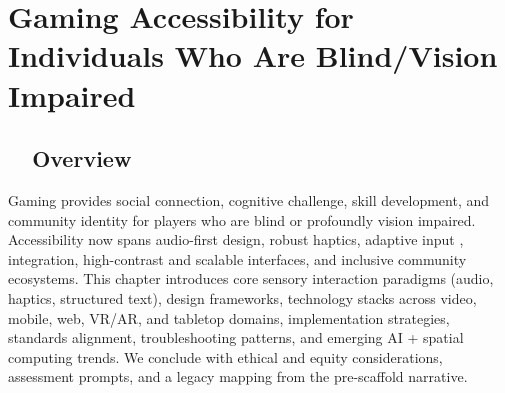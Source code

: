 \chapter{Gaming Accessibility for Individuals Who Are Blind/Vision Impaired}
\label{chap:gaming-accessibility}

\section{~~Overview}
\label{sec:gaming-overview}
Gaming provides social connection, cognitive challenge, skill development, and community identity for players who are blind or profoundly vision impaired. Accessibility now spans audio-first design, robust haptics, adaptive input ,  integration, high-contrast and scalable interfaces, and inclusive community ecosystems\supercite{AbleGamers2025}. This chapter introduces core sensory interaction paradigms (audio, haptics, structured text), design frameworks, technology stacks across video, mobile, web, VR/AR, and tabletop domains, implementation strategies, standards alignment, troubleshooting patterns, and emerging AI + spatial computing trends. We conclude with ethical and equity considerations, assessment prompts, and a legacy mapping from the pre-scaffold narrative.

